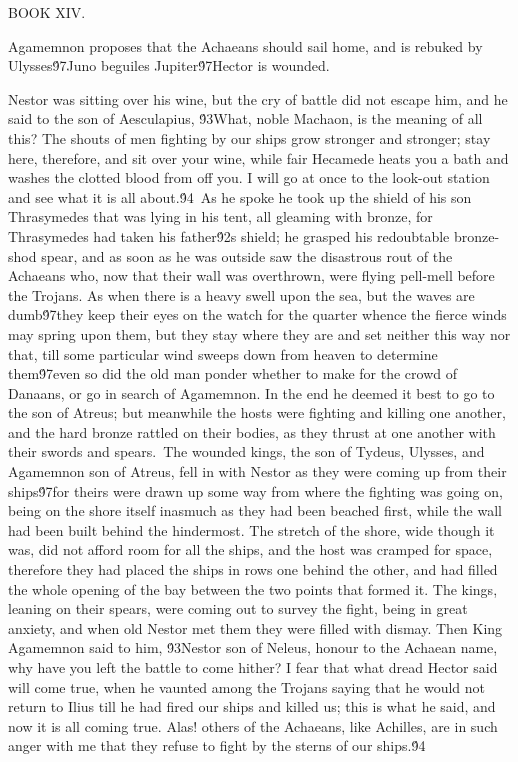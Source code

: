 {  BOOK XIV.\
\pard{}\qj{}

  Agamemnon proposes that the Achaeans should sail home, and is rebuked by Ulysses\'97Juno beguiles Jupiter\'97Hector is wounded.\
\pard{}\qj{}

  Nestor was sitting over his wine, but the cry of battle did not escape him, and he said to the son of Aesculapius, \'93What, noble Machaon, is the meaning of all this? The shouts of men fighting by our ships grow stronger and stronger; stay here, therefore, and sit over your wine, while fair Hecamede heats you a bath and washes the clotted blood from off you. I will go at once to the look-out station and see what it is all about.\'94\
As he spoke he took up the shield of his son Thrasymedes that was lying in his tent, all gleaming with bronze, for Thrasymedes had taken his father\'92s shield; he grasped his redoubtable bronze-shod spear, and as soon as he was outside saw the disastrous rout of the Achaeans who, now that their wall was overthrown, were flying pell-mell before the Trojans. As when there is a heavy swell upon the sea, but the waves are dumb\'97they keep their eyes on the watch for the quarter whence the fierce winds may spring upon them, but they stay where they are and set neither this way nor that, till some particular wind sweeps down from heaven to determine them\'97even so did the old man ponder whether to make for the crowd of Danaans, or go in search of Agamemnon. In the end he deemed it best to go to the son of Atreus; but meanwhile the hosts were fighting and killing one another, and the hard bronze rattled on their bodies, as they thrust at one another with their swords and spears.\
The wounded kings, the son of Tydeus, Ulysses, and Agamemnon son of Atreus, fell in with Nestor as they were coming up from their ships\'97for theirs were drawn up some way from where the fighting was going on, being on the shore itself inasmuch as they had been beached first, while the wall had been built behind the hindermost. The stretch of the shore, wide though it was, did not afford room for all the ships, and the host was cramped for space, therefore they had placed the ships in rows one behind the other, and had filled the whole opening of the bay between the two points that formed it. The kings, leaning on their spears, were coming out to survey the fight, being in great anxiety, and when old Nestor met them they were filled with dismay. Then King Agamemnon said to him, \'93Nestor son of Neleus, honour to the Achaean name, why have you left the battle to come hither? I fear that what dread Hector said will come true, when he vaunted among the Trojans saying that he would not return to Ilius till he had fired our ships and killed us; this is what he said, and now it is all coming true. Alas! others of the Achaeans, like Achilles, are in such anger with me that they refuse to fight by the sterns of our ships.\'94\
}
